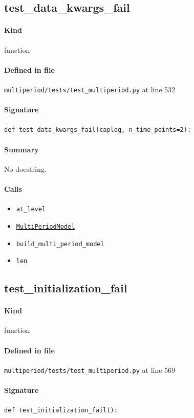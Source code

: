 \documentclass[11pt]{report}
\begin{document}
\subsection{test\_data\_kwargs\_fail}
\label{def:multiperiod-tests-test_multiperiod.py:test_data_kwargs_fail:L532}
\paragraph{Kind} function
\paragraph{Defined in file} \texttt{multiperiod/tests/test\_multiperiod.py} at line 532
\paragraph{Signature} \texttt{def test\_data\_kwargs\_fail(caplog, n\_time\_points=2):}
\paragraph{Summary} No docstring.
\paragraph{Calls}
\begin{itemize}[leftmargin=*]
  \item \texttt{at\_level}
  \item \hyperref[def:multiperiod-multiperiod.py:MultiPeriodModel:L24]{\texttt{MultiPeriodModel}}
  \item \texttt{build\_multi\_period\_model}
  \item \texttt{len}
\end{itemize}
\subsection{test\_initialization\_fail}
\label{def:multiperiod-tests-test_multiperiod.py:test_initialization_fail:L569}
\paragraph{Kind} function
\paragraph{Defined in file} \texttt{multiperiod/tests/test\_multiperiod.py} at line 569
\paragraph{Signature} \texttt{def test\_initialization\_fail():}
\end{document}
